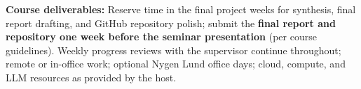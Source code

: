 \documentclass[12pt,a4paper]{article}
\begin{document}
\textbf{Course deliverables:} Reserve time in the final project weeks for synthesis, final report drafting, and GitHub repository polish; submit the \textbf{final report and repository one week before the seminar presentation} (per course guidelines). Weekly progress reviews with the supervisor continue throughout; remote or in-office work; optional Nygen Lund office days; cloud, compute, and LLM resources as provided by the host.

\printbibliography
\end{document}
